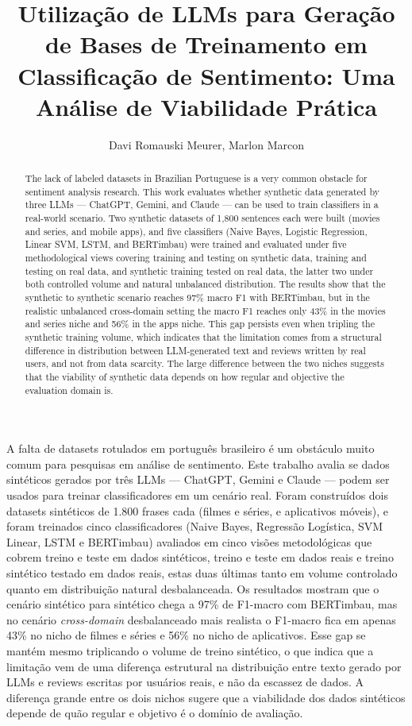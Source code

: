 \documentclass[12pt]{article}
\title{Utilização de LLMs para Geração de Bases de Treinamento em Classificação de Sentimento: Uma Análise de Viabilidade Prática}
\author{Davi Romauski Meurer\inst{1}, Marlon Marcon\inst{1}}
\begin{document}
\maketitle

\begin{abstract}
The lack of labeled datasets in Brazilian Portuguese is a very common obstacle for sentiment analysis research. This work evaluates whether synthetic data generated by three LLMs — ChatGPT, Gemini, and Claude — can be used to train classifiers in a real-world scenario. Two synthetic datasets of 1,800 sentences each were built (movies and series, and mobile apps), and five classifiers (Naive Bayes, Logistic Regression, Linear SVM, LSTM, and BERTimbau) were trained and evaluated under five methodological views covering training and testing on synthetic data, training and testing on real data, and synthetic training tested on real data, the latter two under both controlled volume and natural unbalanced distribution. The results show that the synthetic to synthetic scenario reaches 97\% macro F1 with BERTimbau, but in the realistic unbalanced cross-domain setting the macro F1 reaches only 43\% in the movies and series niche and 56\% in the apps niche. This gap persists even when tripling the synthetic training volume, which indicates that the limitation comes from a structural difference in distribution between LLM-generated text and reviews written by real users, and not from data scarcity. The large difference between the two niches suggests that the viability of synthetic data depends on how regular and objective the evaluation domain is.
\end{abstract}

\begin{resumo}
A falta de datasets rotulados em português brasileiro é um obstáculo muito comum para pesquisas em análise de sentimento. Este trabalho avalia se dados sintéticos gerados por três LLMs — ChatGPT, Gemini e Claude — podem ser usados para treinar classificadores em um cenário real. Foram construídos dois datasets sintéticos de 1.800 frases cada (filmes e séries, e aplicativos móveis), e foram treinados cinco classificadores (Naive Bayes, Regressão Logística, SVM Linear, LSTM e BERTimbau) avaliados em cinco visões metodológicas que cobrem treino e teste em dados sintéticos, treino e teste em dados reais e treino sintético testado em dados reais, estas duas últimas tanto em volume controlado quanto em distribuição natural desbalanceada. Os resultados mostram que o cenário sintético para sintético chega a 97\% de F1-macro com BERTimbau, mas no cenário \textit{cross-domain} desbalanceado mais realista o F1-macro fica em apenas 43\% no nicho de filmes e séries e 56\% no nicho de aplicativos. Esse gap se mantém mesmo triplicando o volume de treino sintético, o que indica que a limitação vem de uma diferença estrutural na distribuição entre texto gerado por LLMs e reviews escritas por usuários reais, e não da escassez de dados. A diferença grande entre os dois nichos sugere que a viabilidade dos dados sintéticos depende de quão regular e objetivo é o domínio de avaliação.
\end{resumo}
\end{document}
